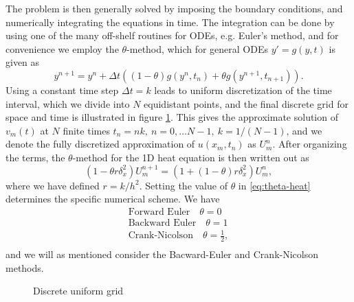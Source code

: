 The problem is then generally solved by imposing the boundary conditions, 
and numerically integrating the equations in time. 
The integration can be done by using one of the many off-shelf routines for ODEs, 
e.g. Euler's method,  
and for convenience we employ the $\theta$-method, 
which for general ODEs $y' = g(y, t)$ is given as
\begin{equation*}
    y^{n+1} = y^n + \Delta t ((1-\theta)g(y^n, t_n)+\theta g(y^{n+1}, t_{n+1})). 
\end{equation*}
Using a constant time step $\Delta t = k$ leads to uniform discretization of the time interval, 
which we divide into $N$ equidistant points, 
and the final discrete grid for space and time is illustrated in figure \ref{fig:2-uniform-grid}.
This gives the approximate solution of $v_m(t)$ at $N$ finite times $t_n = nk, 
\: n = 0, \ldots N-1, 
\: k = 1/(N-1)$, 
and we denote the fully discretized approximation of $u(x_m, t_n)$ as $U_{m}^{n}$. 
After organizing the terms, 
the $\theta$-method for the 1D heat equation is then written out as
\begin{equation}
    (1 - \theta r \delta_x^2)U_m^{n+1} = (1 + (1-\theta)r\delta_x^2)U_m^n, 
    \label{eq:theta-heat}
\end{equation}
where we have defined $r=k/h^2$. 
Setting the value of $\theta$ in \eqref{eq:theta-heat} determines the specific numerical scheme. 
We have
\begin{equation*}
\begin{split}
    \text{Forward Euler} \quad \theta = 0 \\
    \text{Backward Euler} \quad \theta = 1 \\
    \text{Crank-Nicolson} \quad \theta = \frac{1}{2}, \\
\end{split}
\end{equation*}
and we will as mentioned consider the Bacward-Euler and Crank-Nicolson methods. 

\begin{figure}[ht]
    \centering
    
    \caption{Discrete uniform grid}
    \label{fig:2-uniform-grid}
\end{figure}

